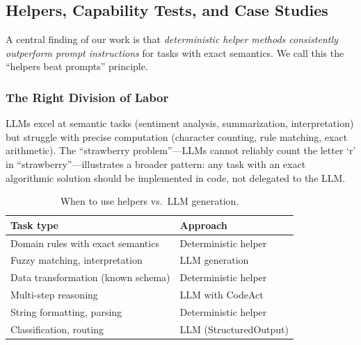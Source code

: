 \documentclass[11pt, logo, onecolumn, copyright, colorlinks=true, allcolors=blue]{nvidiatechreport}
\begin{document}

\subsection{Helpers, Capability Tests, and Case Studies}
\label{sec:helpers}

A central finding of our work is that \emph{deterministic helper methods
consistently outperform prompt instructions} for tasks with exact semantics.
We call this the ``helpers beat prompts'' principle.

\subsubsection{The Right Division of Labor}
\label{sec:helpers:division}

LLMs excel at semantic tasks (sentiment analysis, summarization, interpretation)
but struggle with precise computation (character counting, rule matching, exact
arithmetic). The ``strawberry problem''---LLMs cannot reliably count the letter
`r' in ``strawberry''---illustrates a broader pattern: any task with an exact
algorithmic solution should be implemented in code, not delegated to the LLM.

\begin{table}[h]
\centering
\caption{When to use helpers vs.\ LLM generation.}
\label{tab:division}
\begin{tabular}{ll}
\toprule
\textbf{Task type} & \textbf{Approach} \\
\midrule
Domain rules with exact semantics & Deterministic helper \\
Fuzzy matching, interpretation & LLM generation \\
Data transformation (known schema) & Deterministic helper \\
Multi-step reasoning & LLM with CodeAct \\
String formatting, parsing & Deterministic helper \\
Classification, routing & LLM (StructuredOutput) \\
\bottomrule
\end{tabular}
\end{table}
\end{document}
